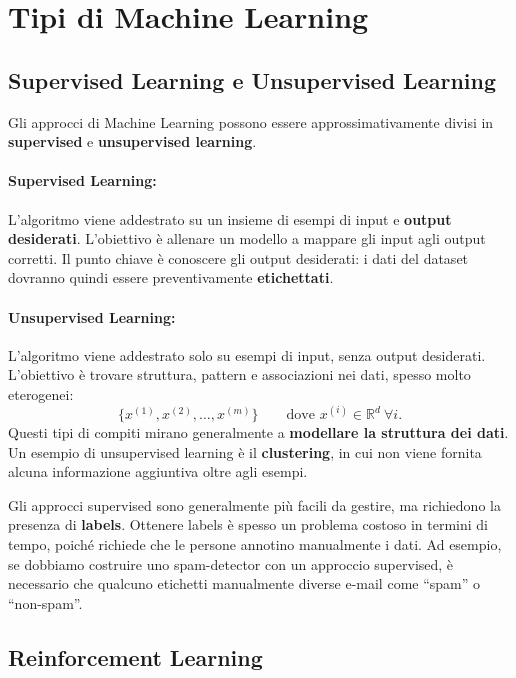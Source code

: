 \section{Tipi di Machine Learning}

\subsection{Supervised Learning e Unsupervised Learning}

Gli approcci di Machine Learning possono essere approssimativamente divisi in \textbf{supervised} e \textbf{unsupervised learning}.

\paragraph{Supervised Learning:}
L'algoritmo viene addestrato su un insieme di esempi di input e \textbf{output desiderati}. L'obiettivo \`e allenare un modello a mappare gli input agli output corretti. Il punto chiave \`e conoscere gli output desiderati: i dati del dataset dovranno quindi essere preventivamente \textbf{etichettati}.

\paragraph{Unsupervised Learning:}
L'algoritmo viene addestrato solo su esempi di input, senza output desiderati. L'obiettivo \`e trovare struttura, pattern e associazioni nei dati, spesso molto eterogenei:
\[
\{x^{(1)}, x^{(2)}, \dots, x^{(m)}\}
\qquad \text{dove } x^{(i)} \in \mathbb{R}^{d}\ \forall i.
\]
Questi tipi di compiti mirano generalmente a \textbf{modellare la struttura dei dati}. Un esempio di unsupervised learning \`e il \textbf{clustering}, in cui non viene fornita alcuna informazione aggiuntiva oltre agli esempi.

Gli approcci supervised sono generalmente pi\`u facili da gestire, ma richiedono la presenza di \textbf{labels}. Ottenere labels \`e spesso un problema costoso in termini di tempo, poich\'e richiede che le persone annotino manualmente i dati. Ad esempio, se dobbiamo costruire uno spam-detector con un approccio supervised, \`e necessario che qualcuno etichetti manualmente diverse e-mail come ``spam'' o ``non-spam''.

\subsection{Reinforcement Learning}

